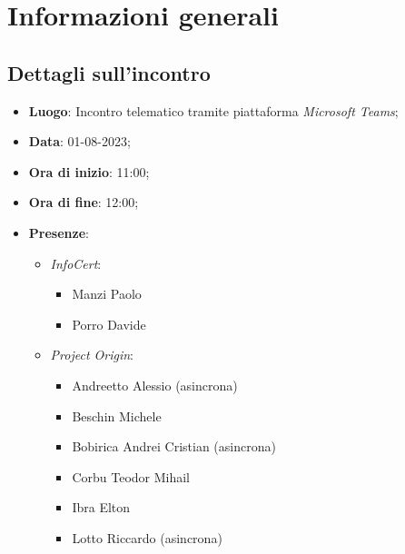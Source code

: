 \section{Informazioni generali}

\subsection{Dettagli sull'incontro}
\begin{itemize}
\item \textbf{Luogo}: Incontro telematico tramite piattaforma \textit{Microsoft Teams\glo};
\item \textbf{Data}: 01-08-2023;
\item \textbf{Ora di inizio}: 11:00;
\item \textbf{Ora di fine}: 12:00;
\item \textbf{Presenze}: 
\begin{itemize}
    \item \textit{InfoCert}: \begin{itemize}
            \item Manzi Paolo
            \item Porro Davide 
        \end{itemize}  
    \item \textit{Project Origin}:  \begin{itemize}
        \item Andreetto Alessio (asincrona)
        \item Beschin Michele
        \item Bobirica Andrei Cristian (asincrona)
        \item Corbu Teodor Mihail
        \item Ibra Elton
        \item Lotto Riccardo (asincrona)
    \end{itemize}	
\end{itemize}
\end{itemize}



